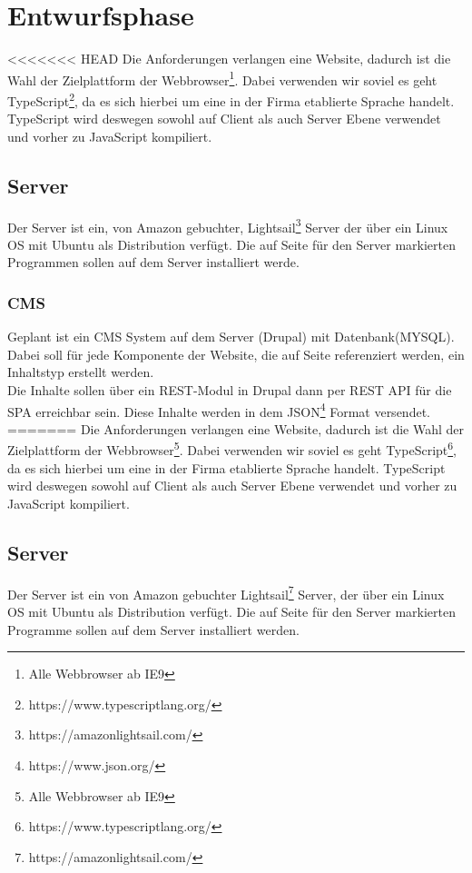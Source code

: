 \documentclass[11pt,a4paper]{article}
\begin{document}
\section{Entwurfsphase}
<<<<<<< HEAD
Die Anforderungen verlangen eine Website, dadurch ist die Wahl der Zielplattform der Webbrowser\footnote{Alle Webbrowser ab IE9}. Dabei verwenden wir soviel es geht TypeScript\footnote{https://www.typescriptlang.org/}, da es sich hierbei um eine in der Firma etablierte Sprache handelt. TypeScript wird deswegen sowohl auf Client als auch Server Ebene verwendet und vorher zu JavaScript kompiliert.
\subsection{Server}
Der Server ist ein, von Amazon gebuchter, Lightsail\footnote{https://amazonlightsail.com/} Server der über ein Linux OS mit Ubuntu als Distribution verfügt. Die auf Seite \pageref{sec:progs} für den Server markierten Programmen sollen auf dem Server installiert werde.
\subsubsection{CMS}
Geplant ist ein CMS System auf dem Server (Drupal) mit Datenbank(MYSQL). Dabei soll für jede Komponente der Website, die auf Seite \pageref{sec:epage}
referenziert werden, ein Inhaltstyp erstellt werden.\\
Die Inhalte sollen über ein REST-Modul in Drupal dann per REST \acs{API} für die SPA erreichbar sein.
Diese Inhalte  werden in dem JSON\footnote{https://www.json.org/} Format versendet.
=======
Die Anforderungen verlangen eine Website, dadurch ist die Wahl der Zielplattform der Webbrowser\footnote{Alle Webbrowser ab IE9}. Dabei verwenden wir soviel es geht TypeScript\footnote{https://www.typescriptlang.org/}, da es sich hierbei um eine in der Firma etablierte Sprache handelt. TypeScript wird deswegen sowohl auf Client als auch Server Ebene verwendet und vorher zu JavaScript kompiliert.
\subsection{Server}
Der Server ist ein von Amazon gebuchter Lightsail\footnote{https://amazonlightsail.com/} Server, der über ein Linux OS mit Ubuntu als Distribution verfügt. Die auf Seite \pageref{sec:progs} für den Server markierten Programme sollen auf dem Server installiert werden.
\end{document}

